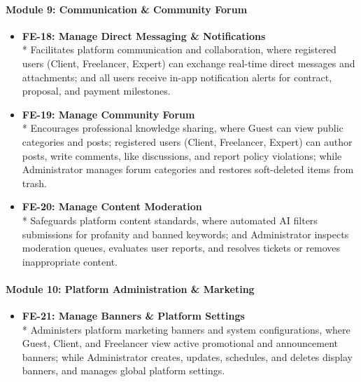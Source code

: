 \paragraph*{Module 9: Communication \& Community Forum}
\begin{itemize}[leftmargin=1.0cm, label=--]

\item \textbf{FE-18: Manage Direct Messaging \& Notifications} \\*
Facilitates platform communication and collaboration, where registered users (Client, Freelancer, Expert) can exchange real-time direct messages and attachments; and all users receive in-app notification alerts for contract, proposal, and payment milestones.

\item \textbf{FE-19: Manage Community Forum} \\*
Encourages professional knowledge sharing, where Guest can view public categories and posts; registered users (Client, Freelancer, Expert) can author posts, write comments, like discussions, and report policy violations; while Administrator manages forum categories and restores soft-deleted items from trash.

\item \textbf{FE-20: Manage Content Moderation} \\*
Safeguards platform content standards, where automated AI filters submissions for profanity and banned keywords; and Administrator inspects moderation queues, evaluates user reports, and resolves tickets or removes inappropriate content.

\end{itemize}

\paragraph*{Module 10: Platform Administration \& Marketing}
\begin{itemize}[leftmargin=1.0cm, label=--]

\item \textbf{FE-21: Manage Banners \& Platform Settings} \\*
Administers platform marketing banners and system configurations, where Guest, Client, and Freelancer view active promotional and announcement banners; while Administrator creates, updates, schedules, and deletes display banners, and manages global platform settings.

\end{itemize}

